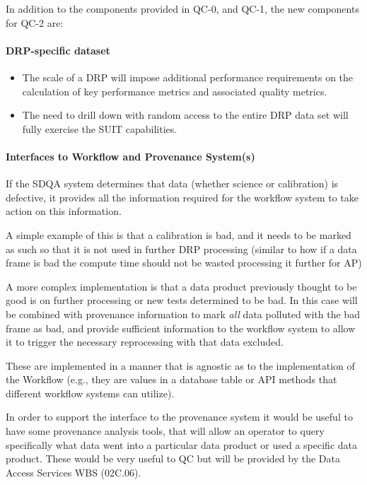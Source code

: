 In addition to the components provided in QC-0, and QC-1, the new components for QC-2 are:

\paragraph{DRP-specific dataset}
\label{sec:qaDrpDataset}
\begin{itemize}
\item The scale of a DRP will impose additional performance requirements on the calculation of key performance metrics and associated quality metrics.
\item The need to drill down with random access to the entire DRP data set will fully exercise the SUIT capabilities.
\end{itemize}


\paragraph{Interfaces to Workflow and Provenance System(s)}
\label{sec:qaOutputInterfaceWorkflowSystem}

If the SDQA system determines that data (whether science or calibration) is defective, it provides all the information required for the workflow system to take action on this information.

A simple example of this is that a calibration is bad, and it needs to be marked as such so that it is not used in further DRP processing (similar to how if a data frame is bad the compute time should not be wasted processing it further for AP)

A more complex implementation is that a data product previously thought to be good is on further processing or new tests determined to be bad. In this case will be combined with provenance information to mark \emph{all} data polluted with the bad frame as bad, and provide sufficient information to the workflow system to allow it to trigger the necessary reprocessing with that data excluded.

These are implemented in a manner that is agnostic as to the implementation of the Workflow (e.g., they are values in a database table or API methods that different workflow systems can utilize).

In order to support the interface to the provenance system it would be useful to have some provenance analysis tools, that will allow an operator to query specifically what data went into a particular data product or used a specific data product. These would be very useful to QC but will be provided by the Data Access Services WBS (02C.06).

